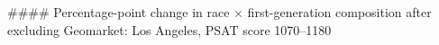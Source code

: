 #### Percentage-point change in race × first-generation composition after excluding Geomarket: Los Angeles, PSAT score 1070–1180
